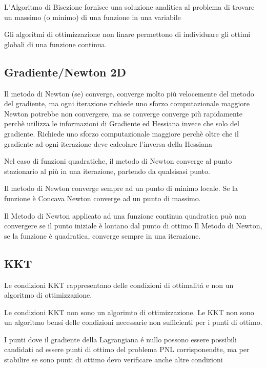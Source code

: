 \documentclass[12pt, a4paper, openany]{book}
\begin{document}
\affermazione
{L'Algoritmo di Bisezione fornisce una soluzione analitica al problema di trovare un massimo (o minimo) di una funzione in una variabile}

\affermazione
{Gli algoritmi di ottimizzazione non linare permettono di individuare gli ottimi globali di una funzione continua.}

\subsection{Gradiente/Newton 2D}

\affermazionetrue
{Il metodo di Newton (se) converge, converge molto più velocemente del metodo del gradiente, ma ogni iterazione richiede uno sforzo computazionale maggiore}
{Newton potrebbe non convergere, ma se converge converge più rapidamente perchè utilizza le informazioni di Gradiente ed Hessiana invece che solo del gradiente.
Richiede uno sforzo computazionale maggiore perchè oltre che il gradiente ad ogni iterazione deve calcolare l'inversa della Hessiana}

\affermazionetrue
{Nel caso di funzioni quadratiche, il metodo di Newton converge al punto stazionario al più in una iterazione, partendo da qualsisasi punto.}

\affermazionefalse
{Il metodo di Newton converge sempre ad un punto di minimo locale.}
{Se la funzione è Concava Newton converge ad un punto di massimo.}

\affermazionefalse
{Il Metodo di Newton applicato ad una funzione continua quadratica può non convergere se il punto iniziale è lontano dal punto di ottimo}
{Il Metodo di Newton, se la funzione è quadratica, converge sempre in una iterazione.}

\subsection{KKT}
\affermazionetrue
{Le condizioni KKT rappresentano delle condizioni di ottimalitá e non un algoritmo di ottimizzazione.}

\affermazionetrue
{Le condizioni KKT non sono un algorimto di ottimizzazione.}
{Le KKT non sono un algoritmo bensí delle condizioni necessarie non sufficienti per i punti di ottimo.}

\affermazionetrue
{I punti dove il gradiente della Lagrangiana é nullo possono essere possibili candidati ad essere punti di ottimo del problema PNL corrisponendte,
ma per stabilire se sono punti di ottimo devo verificare anche altre condizioni}
{}
\end{document}
